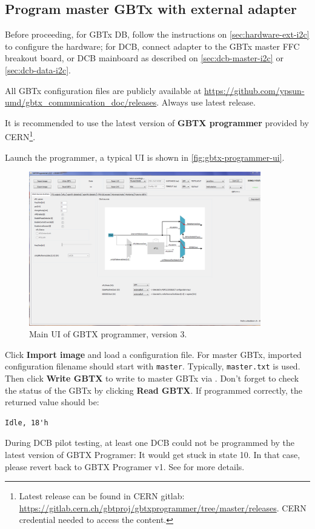\subsection{Program master GBTx with external \itwoc adapter}
Before proceeding, for GBTx DB, follow the instructions on
\autoref{sec:hardware-ext-i2c} to configure the hardware;
for DCB, connect \itwoc adapter to the GBTx master FFC breakout board, or DCB
mainboard as described on \autoref{sec:dcb-master-i2c} or
\autoref{sec:dcb-data-i2c}.

All GBTx configuration files are publicly available at
\url{https://github.com/ypsun-umd/gbtx_communication_doc/releases}.
Always use latest release.

It is recommended to use the latest version of \textbf{GBTX programmer} provided
by CERN\footnote{
    Latest release can be found in CERN gitlab:
    \url{https://gitlab.cern.ch/gbtproj/gbtxprogrammer/tree/master/releases}.
    CERN credential needed to access the content.
}.

Launch the programmer, a typical UI is shown in
\autoref{fig:gbtx-programmer-ui}.

\begin{figure}[!ht]
    \centering
    \includegraphics[width=0.9\textwidth]{res/gbtx_programmer_v3_ui.png}
    \caption{Main UI of GBTX programmer, version 3.}
    \label{fig:gbtx-programmer-ui}
\end{figure}

Click \textbf{Import image} and load a configuration file.
For master GBTx, imported configuration filename should start with
\texttt{master}.
Typically, \texttt{master.txt} is used.
Then click \textbf{Write GBTX} to write to master GBTx via \itwoc.
Don't forget to check the status of the GBTx by clicking \textbf{Read GBTX}.
If programmed correctly, the returned value should be:

\begin{lstlisting}
Idle, 18'h
\end{lstlisting}

\begin{leftbar}
    During DCB pilot testing, at least one DCB could not be programmed by the
    latest version of GBTX Programer: It would get stuck in state 10.
    In that case, please revert back to GBTX Programer v1.
    See  for more details.
\end{leftbar}
